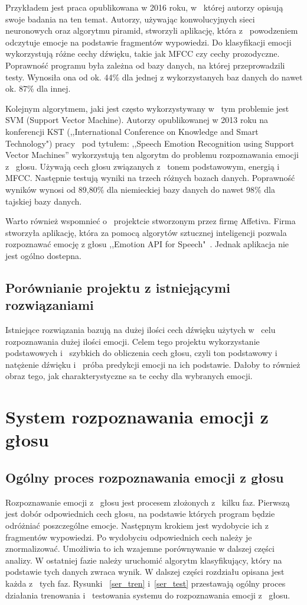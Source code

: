 \documentclass[declaration,shortabstract]{iithesis}
\begin{document}
Przykładem jest praca\cite{sernn} opublikowana w 2016 roku, w~ której autorzy opisują swoje badania na ten temat. Autorzy, używając konwolucyjnych sieci neuronowych oraz algorytmu piramid, stworzyli aplikację, która z~ powodzeniem odczytuje emocje na podstawie fragmentów wypowiedzi. Do klasyfikacji emocji wykorzystują różne cechy dźwięku, takie jak MFCC czy cechy prozodyczne. Poprawność programu była zależna od bazy danych, na której przeprowadzili testy. Wynosiła ona od ok. 44\% dla jednej z wykorzystanych baz danych do nawet ok. 87\% dla innej.

Kolejnym algorytmem, jaki jest często wykorzystywany w~ tym problemie jest SVM (Support Vector Machine). Autorzy opublikowanej w 2013 roku na konferencji KST (,,International Conference on Knowledge and Smart Technology") pracy~\cite{svn} pod tytułem: ,,Speech Emotion Recognition using Support Vector Machines” wykorzystują ten algorytm do problemu rozpoznawania emocji z~ głosu. Używają cech głosu związanych z~ tonem podstawowym, energią i~ MFCC. Następnie testują wyniki na trzech różnych bazach danych. Poprawność wyników wynosi od 89,80\% dla niemieckiej bazy danych do nawet 98\% dla tajskiej bazy danych.

Warto również wspomnieć o~ projektcie stworzonym przez firmę Affetiva. Firma stworzyła aplikację, która za pomocą algorytów sztucznej inteligencji pozwala rozpoznawać emocję z głosu ,,Emotion API for Speech"~\cite{emo_api_speech}. Jednak aplikacja nie jest ogólno dostepna.

\section{Porównianie projektu z istniejącymi rozwiązaniami}
Istniejące rozwiązania bazują na dużej ilości cech dźwięku użytych w~ celu rozpoznawania dużej ilości emocji.
Celem tego projektu wykorzystanie podstawowych i~ szybkich do obliczenia cech głosu, czyli ton podstawowy i~ natężenie dźwięku i~ próba predykcji emocji na ich podstawie. Dałoby to również obraz tego, jak charakterystyczne sa te cechy dla wybranych emocji.

\let\cleardoublepage\clearpage
\chapter{System rozpoznawania emocji z głosu}
\section{Ogólny proces rozpoznawania emocji z głosu}
Rozpoznawanie emocji z~ głosu jest procesem złożonych z~ kilku faz.
Pierwszą jest dobór odpowiednich cech głosu, na podstawie których program będzie odróżniać poszczególne emocje. Następnym krokiem jest wydobycie ich z~ fragmentów wypowiedzi. Po wydobyciu odpowiednich cech należy je znormalizować. Umożliwia to ich wzajemne porównywanie w dalszej części analizy. W ostatniej fazie należy uruchomić algorytm klasyfikujący, który na podstawie tych danych zwraca wynik.
W dalszej części rozdziału opisana jest każda z~ tych faz. Rysunki ~\ref{ser_tren} i~\ref{ser_test} przestawają ogólny proces działania trenowania i~ testowania systemu do rozpoznawania emocji z~ głosu.
\end{document}
